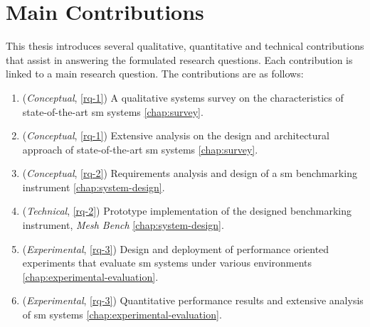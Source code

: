 \section{Main Contributions}
\label{sec:introduction:contributions}

This thesis introduces several qualitative, quantitative and technical contributions that assist in answering the formulated research questions. Each contribution is linked to a main research question. The contributions are as follows:



\begin{enumerate}
    \item (\textit{Conceptual}, \ref{rq-1}) A qualitative systems survey on the characteristics of state-of-the-art \gls{sm} systems \cref{chap:survey}.
    
    \item (\textit{Conceptual}, \ref{rq-1}) Extensive analysis on the design and architectural approach of state-of-the-art \gls{sm} systems \cref{chap:survey}.    
    
    \item (\textit{Conceptual}, \ref{rq-2}) Requirements analysis and design of a \gls{sm} benchmarking instrument  \cref{chap:system-design}.  
    
    \item (\textit{Technical}, \ref{rq-2}) Prototype implementation  of the designed benchmarking instrument, \textit{Mesh Bench} \cref{chap:system-design}.

    \item (\textit{Experimental}, \ref{rq-3}) Design and deployment of performance oriented experiments that evaluate \gls{sm} systems under various environments \cref{chap:experimental-evaluation}.
    
    \item (\textit{Experimental}, \ref{rq-3}) Quantitative performance results and extensive analysis of \gls{sm} systems \cref{chap:experimental-evaluation}.
\end{enumerate}


 
